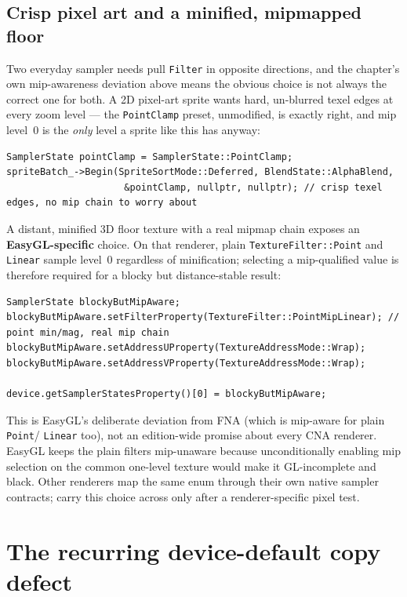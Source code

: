 \subsection{Crisp pixel art and a minified, mipmapped floor}

Two everyday sampler needs pull \texttt{Filter} in opposite directions, and the chapter's own
mip-awareness deviation above means the obvious choice is not always the correct one for both.
A 2D pixel-art sprite wants hard, un-blurred texel edges at every zoom level --- the
\texttt{PointClamp} preset, unmodified, is exactly right, and mip level~0 is the \emph{only}
level a sprite like this has anyway:

\begin{lstlisting}
SamplerState pointClamp = SamplerState::PointClamp;
spriteBatch_->Begin(SpriteSortMode::Deferred, BlendState::AlphaBlend,
                     &pointClamp, nullptr, nullptr); // crisp texel edges, no mip chain to worry about
\end{lstlisting}

A distant, minified 3D floor texture with a real mipmap chain exposes an
\textbf{EasyGL-specific} choice. On that renderer, plain \texttt{TextureFilter::Point} and
\texttt{Linear} sample level~0 regardless of minification; selecting a mip-qualified value is
therefore required for a blocky but distance-stable result:

\begin{lstlisting}
SamplerState blockyButMipAware;
blockyButMipAware.setFilterProperty(TextureFilter::PointMipLinear); // point min/mag, real mip chain
blockyButMipAware.setAddressUProperty(TextureAddressMode::Wrap);
blockyButMipAware.setAddressVProperty(TextureAddressMode::Wrap);

device.getSamplerStatesProperty()[0] = blockyButMipAware;
\end{lstlisting}

This is EasyGL's deliberate deviation from FNA (which is mip-aware for plain \texttt{Point}/
\texttt{Linear} too), not an edition-wide promise about every CNA renderer. EasyGL keeps the plain
filters mip-unaware because unconditionally enabling mip selection on the common one-level texture
would make it GL-incomplete and black. Other renderers map the same enum through their own native
sampler contracts; carry this choice across only after a renderer-specific pixel test.

\section{The recurring device-default copy defect}

